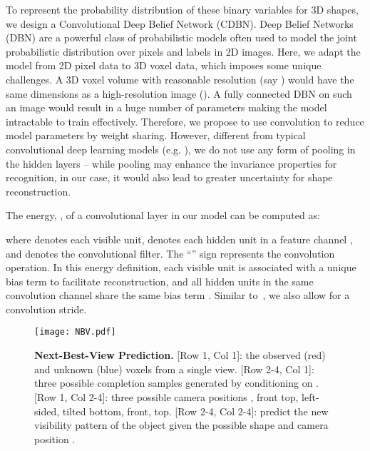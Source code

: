 \documentclass[10pt,twocolumn,letterpaper]{article}
\begin{document}
To represent the probability distribution of these binary variables for 3D shapes,
we design a Convolutional Deep Belief Network (CDBN).
Deep Belief Networks (DBN) \cite{DBN} are a powerful class of probabilistic models often used to model the joint probabilistic distribution over pixels and labels in 2D images. 
Here, we adapt the model from 2D pixel data to 3D voxel data, 
which imposes some unique challenges. A 3D voxel volume with reasonable resolution (say ) would have the same dimensions as a high-resolution image (). A fully connected DBN on such an image would result in a huge number of parameters making the model intractable to train effectively. 
Therefore, we propose to use convolution to reduce model parameters by weight sharing.
However, different from typical convolutional deep learning models (e.g. \cite{CDBN}),
we do not use any form of pooling in the hidden layers --
while pooling may enhance the invariance properties for recognition, in our case, it would also lead to greater uncertainty for shape reconstruction.

The energy, , of a convolutional layer in our model can be computed as:

where  denotes each visible unit,  denotes each hidden unit in a feature channel , and  denotes the convolutional filter. The ``'' sign represents the convolution operation. In this energy definition, each visible unit  is associated with a unique bias term  to facilitate reconstruction, and all hidden units  in the same convolution channel share the same bias term . Similar to~\cite{DCNN}, we also allow for a convolution stride.


\begin{figure}[t]
\texttt{[image: NBV.pdf]}

\vspace{-2mm}
\caption{{\bf Next-Best-View Prediction.} 
[Row 1, Col 1]: the observed (red) and unknown (blue) voxels from a single view.
[Row 2-4, Col 1]: three possible completion samples generated by conditioning on . 
[Row 1, Col 2-4]: three possible camera positions , front top, left-sided, tilted bottom, front, top. 
[Row 2-4, Col 2-4]: predict the new visibility pattern of the object given the possible shape and camera position .}
\label{fig:nextview}

\vspace{-3mm}
\end{figure}
\end{document}
